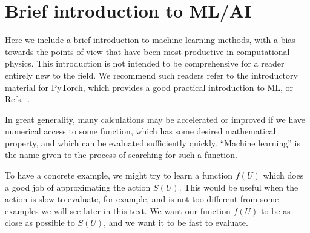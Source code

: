 \documentclass[12pt]{article}
\begin{document}
\section{Brief introduction to ML/AI}

Here we include a brief introduction to machine learning methods, with a bias towards the points of view that have been most productive in computational physics. This introduction is not intended to be comprehensive for a reader entirely new to the field. We recommend such readers refer to the introductory material for PyTorch, which provides a good practical introduction to ML, or Refs.~\cite{Mehta:2018dln, raschka2022machine,Marquardt2025MLPhysicists}.

In great generality, many calculations may be accelerated or improved if we have numerical access to some function, which has some desired mathematical property, and which can be evaluated sufficiently quickly. ``Machine learning'' is the name given to the process of searching for such a function.

To have a concrete example, we might try to learn a function $f(U)$ which does a good job of approximating the action $S(U)$. This would be useful when the action is slow to evaluate, for example, and is not too different from some examples we will see later in this text. We want our function $f(U)$ to be as close as possible to $S(U)$, and we want it to be fast to evaluate.
\end{document}
